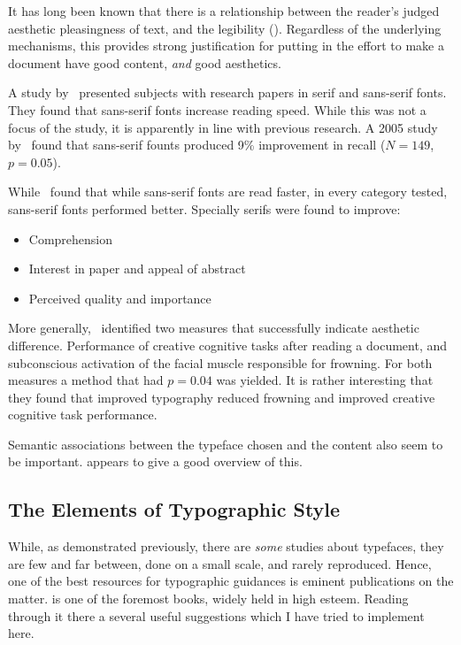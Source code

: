 \documentclass[solid,math,chem,code,plot,gloss]{bmc}
\begin{document}
It has long been known that there is a relationship between the reader's judged
aesthetic pleasingness of text, and the legibility (\cite{Tinker_Paterson_1942}).
Regardless of the underlying mechanisms, this provides strong justification for
putting in the effort to make a document have good content, \emph{and} good aesthetics.

A study by~\cite{kaspar2015matter} presented subjects with research papers in
serif and sans-serif fonts. They found that sans-serif fonts increase reading speed.
While this was not a focus of the study, it is apparently in line with previous research.
A 2005 study by~\cite{Gasser_Boeke_Haffernan_Tan_2005} found that
sans-serif founts produced 9\% improvement in recall (\(N=149\), \(p=0.05\)).

While~\cite{kaspar2015matter} found that while sans-serif fonts are read faster,
in every category tested, sans-serif fonts performed better. Specially serifs were
found to improve:
\begin{itemize}
    \item Comprehension
    \item Interest in paper and appeal of abstract
    \item Perceived quality and importance
\end{itemize}

More generally,~\cite{larson2007measuring} identified two measures that
successfully indicate aesthetic difference. Performance of creative cognitive tasks
after reading a document, and subconscious activation of the facial muscle
responsible for frowning. For both measures a method that had \(p=0.04\) was yielded.
It is rather interesting that they found that improved typography reduced frowning
and improved creative cognitive task performance.

Semantic associations between the typeface chosen and the content also seem to be
important. \cite{web_chooserightfont} appears to give a good overview of this.

\subsection{The Elements of Typographic Style}
While, as demonstrated previously, there are \textit{some} studies about typefaces,
they are few and far between, done on a small scale, and rarely reproduced.
Hence, one of the best resources for typographic guidances is eminent publications
on the matter.  is one of the foremost books, widely held
in high esteem. Reading through it there a several useful suggestions which I have
tried to implement here.
\end{document}
